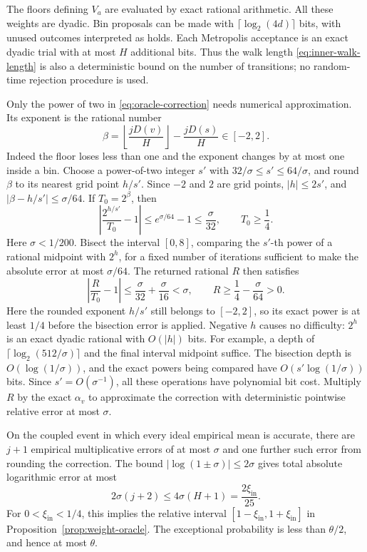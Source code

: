 The floors defining $V_a$ are evaluated by exact rational arithmetic.
All these weights are dyadic.  Bin proposals can be made with
$\lceil\log_2(4d)\rceil$ bits, with unused outcomes interpreted as
holds.  Each Metropolis acceptance is an exact dyadic trial with at
most $H$ additional bits.  Thus the walk length
\eqref{eq:inner-walk-length} is also a deterministic bound on the
number of transitions; no random-time rejection procedure is used.

Only the power of two in \eqref{eq:oracle-correction} needs numerical
approximation.  Its exponent is the rational number
\[
 \beta=\left\lfloor\frac{jD(v)}H\right\rfloor
                          -\frac{jD(s)}H\in[-2,2].
\]
Indeed the floor loses less than one and the exponent changes by at
most one inside a bin.  Choose a power-of-two integer $s'$ with
$32/\sigma\le s'\le64/\sigma$, and round $\beta$ to its nearest
grid point $h/s'$.  Since $-2$ and $2$ are grid points, $|h|\le2s'$,
and $|\beta-h/s'|\le\sigma/64$.  If $T_0=2^\beta$, then
\[
 \left|\frac{2^{h/s'}}{T_0}-1\right|
 \le e^{\sigma/64}-1\le\frac\sigma{32},
 \qquad T_0\ge\frac14.
\]
Here $\sigma<1/200$.  Bisect the interval $[0,8]$, comparing the
$s'$-th power of a rational midpoint with $2^h$, for a fixed number of
iterations sufficient to make the absolute error at most $\sigma/64$.
The returned rational $R$ then satisfies
\[
 \left|\frac R{T_0}-1\right|
 \le\frac\sigma{32}+\frac\sigma{16}<\sigma,
 \qquad R\ge\frac14-\frac\sigma{64}>0.
\]
Here the rounded exponent $h/s'$ still belongs to $[-2,2]$, so its
exact power is at least $1/4$ before the bisection error is applied.
Negative $h$ causes no difficulty: $2^h$ is an exact dyadic rational
with $O(|h|)$ bits.  For example, a depth of
$\lceil\log_2(512/\sigma)\rceil$ and the final interval midpoint
suffice.  The bisection depth is $O(\log(1/\sigma))$, and
the exact powers being compared have
$O(s'\log(1/\sigma))$ bits.  Since $s'=O(\sigma^{-1})$, all these
operations have polynomial bit cost.  Multiply $R$ by the exact
$\alpha_v$ to approximate the correction with deterministic pointwise
relative error at most $\sigma$.

On the coupled event in which every ideal empirical mean is accurate,
there are $j+1$ empirical multiplicative errors of at most $\sigma$
and one further such error from rounding the correction.  The bound
$|\log(1\pm\sigma)|\le2\sigma$ gives total absolute logarithmic error
at most
\[
 2\sigma(j+2)\le4\sigma(H+1)=\frac{2\xi_{\mathrm{in}}}{25}.
\]
For $0<\xi_{\mathrm{in}}<1/4$, this implies the relative interval
$[1-\xi_{\mathrm{in}},1+\xi_{\mathrm{in}}]$ in
Proposition~\ref{prop:weight-oracle}.  The exceptional probability is
less than $\theta/2$, and hence at most $\theta$.

